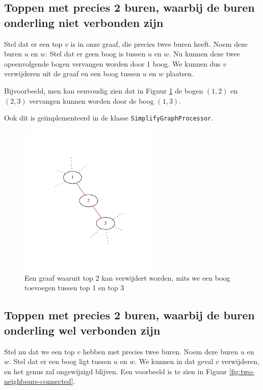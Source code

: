 \documentclass{article}
\begin{document}
\subsection{Toppen met precies 2 buren, waarbij de buren onderling niet
verbonden zijn}
Stel dat er een top $v$ is in onze graaf, die precies twee buren heeft. Noem
deze buren $u$ en $w$. Stel dat er geen boog is tussen $u$ en $w$. Nu kunnen
deze twee opeenvolgende bogen vervangen worden door 1 boog. We kunnen dus
$v$ verwijderen uit de graaf en een boog tussen $u$ en $w$ plaatsen.
\newline

Bijvoorbeeld, men kan eenvoudig zien dat in Figuur
\ref{fig:two-neighbours-not-connected} de bogen $(1, 2)$ en $(2, 3)$ vervangen
kunnen worden door de boog $(1, 3)$.
\newline

Ook dit is ge\"implementeerd in de klasse \verb#SimplifyGraphProcessor#.

\begin{figure}
\begin{center}
\includegraphics[width=0.6\textwidth]{images/two-neighbours-not-connected.pdf}
\caption{Een graaf waaruit top 2 kan verwijdert worden, mits we een boog
toevoegen tussen top 1 en top 3}
\label{fig:two-neighbours-not-connected}
\end{center}
\end{figure}

\subsection{Toppen met precies 2 buren, waarbij de buren onderling wel
verbonden zijn}
Stel nu dat we een top $v$ hebben met precies twee buren. Noem deze buren
$u$ en $w$. Stel dat er een boog ligt tussen $u$ en $w$. We kunnen in dat
geval $v$ verwijderen, en het genus zal ongewijzigd blijven. Een voorbeeld is
te zien in Figuur \ref{fig:two-neighbours-connected}.
\newline
\end{document}
